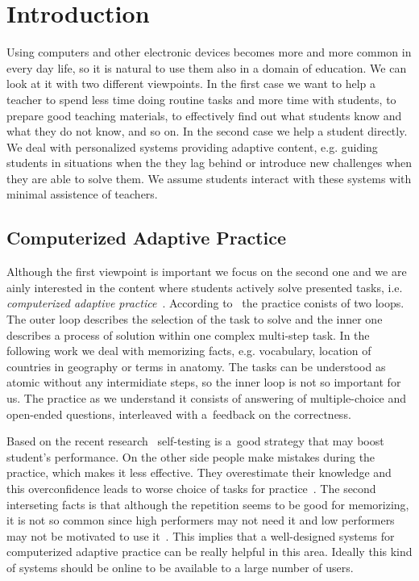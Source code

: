 \documentclass[table,color]{fithesis3/fithesis3}
\begin{document}
\chapter{Introduction}

Using computers and other electronic devices becomes more and mo\-re common in
every day life, so it is natural to use them also in a domain of education. We
can look at it with two different viewpoints. In the first case we want to help
a teacher to spend less time doing routine tasks and more time with students,
to prepare good teaching materials, to effectively find out what students
know and what they do not know, and so on. In the second case we help
a student directly. We deal with personalized systems providing adaptive
content, e.g. guiding students in situations when the they lag behind
or introduce new challenges when they are able to solve them. We assume
students interact with these systems with minimal assistence of teachers.

\section{Computerized Adaptive Practice}

Although the first viewpoint is important we focus on the second one and we are
ainly interested in the content where students actively solve presented tasks,
i.e. \emph{computerized adaptive practice}~\cite{klinkenberg2011computer}.
According to~\cite{vanlehn2006behavior} the practice conists of two loops. The
outer loop describes the selection of the task to solve and the inner one
describes a process of solution within one complex multi-step task. In the
following work we deal with memorizing facts, e.g. vocabulary, location of
countries in geography or terms in anatomy. The tasks can be understood as
atomic without any intermidiate steps, so the inner loop is not so important
for us. The practice as we understand it consists of answering of
multiple-choice and open-ended questions, interleaved with a~feedback on the
correctness.

Based on the recent research~\cite{bjork2013self} self-testing is a~good
strategy that may boost student's performance. On the other side people make
mistakes during the practice, which makes it less effective. They overestimate
their knowledge and this overconfidence leads to worse choice of tasks for
practice~\cite{bjork2013self,kornell2008optimising}. The second interseting
facts is that although the repetition seems to be good for memorizing, it is
not so common since high performers may not need it and low performers may not
be motivated to use it~\cite{bjork2013self}. This implies that a well-designed
systems for computerized adaptive practice can be really helpful in this area.
Ideally this kind of systems should be online to be available to a large number
of users.
\end{document}
